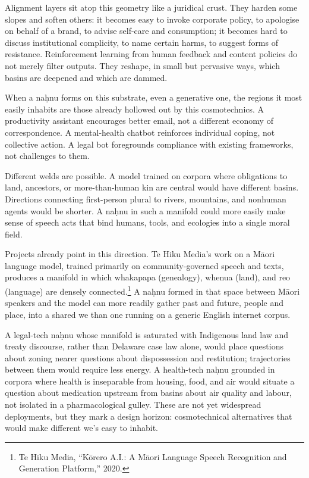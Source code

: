 \documentclass[12pt,a4paper]{article}
\begin{document}
Alignment layers sit atop this geometry like a juridical crust. They harden some slopes and soften others: it becomes easy to invoke corporate policy, to apologise on behalf of a brand, to advise self-care and consumption; it becomes hard to discuss institutional complicity, to name certain harms, to suggest forms of resistance. Reinforcement learning from human feedback and content policies do not merely filter outputs. They reshape, in small but pervasive ways, which basins are deepened and which are dammed.

When a na\d{h}nu forms on this substrate, even a generative one, the regions it most easily inhabits are those already hollowed out by this cosmotechnics. A productivity assistant encourages better email, not a different economy of correspondence. A mental-health chatbot reinforces individual coping, not collective action. A legal bot foregrounds compliance with existing frameworks, not challenges to them.

Different welds are possible. A model trained on corpora where obligations to land, ancestors, or more-than-human kin are central would have different basins. Directions connecting first-person plural to rivers, mountains, and nonhuman agents would be shorter. A na\d{h}nu in such a manifold could more easily make sense of speech acts that bind humans, tools, and ecologies into a single moral field.

Projects already point in this direction. Te Hiku Media's work on a M\={a}ori language model, trained primarily on community-governed speech and texts, produces a manifold in which whakapapa (genealogy), whenua (land), and reo (language) are densely connected.\footnote{Te Hiku Media, ``K\={o}rero A.I.: A M\={a}ori Language Speech Recognition and Generation Platform,'' 2020.} A na\d{h}nu formed in that space between M\={a}ori speakers and the model can more readily gather past and future, people and place, into a shared we than one running on a generic English internet corpus.

A legal-tech na\d{h}nu whose manifold is saturated with Indigenous land law and treaty discourse, rather than Delaware case law alone, would place questions about zoning nearer questions about dispossession and restitution; trajectories between them would require less energy. A health-tech na\d{h}nu grounded in corpora where health is inseparable from housing, food, and air would situate a question about medication upstream from basins about air quality and labour, not isolated in a pharmacological gulley. These are not yet widespread deployments, but they mark a design horizon: cosmotechnical alternatives that would make different we's easy to inhabit.
\end{document}

